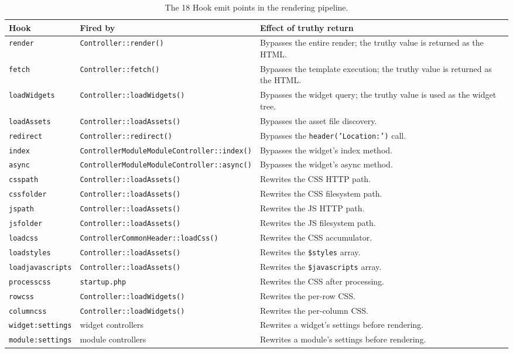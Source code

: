 \documentclass[11pt,a4paper]{article}
\begin{document}
\begin{table}[htbp]
\centering
\caption{The 18 Hook emit points in the rendering pipeline.}\label{tab:hooks}
\footnotesize\sloppy
\begin{tabularx}{\columnwidth}{llX}
\toprule
\textbf{Hook} & \textbf{Fired by} & \textbf{Effect of truthy return} \\
\midrule
\texttt{render}        & \texttt{Controller::render()}    & Bypasses the entire render; the truthy value is returned as the HTML. \\
\texttt{fetch}         & \texttt{Controller::fetch()}     & Bypasses the template execution; the truthy value is returned as the HTML. \\
\texttt{loadWidgets}   & \texttt{Controller::loadWidgets()} & Bypasses the widget query; the truthy value is used as the widget tree. \\
\texttt{loadAssets}    & \texttt{Controller::loadAssets()} & Bypasses the asset file discovery. \\
\texttt{redirect}      & \texttt{Controller::redirect()}  & Bypasses the \texttt{header('Location:')} call. \\
\texttt{index}         & \texttt{ControllerModuleModuleController::index()} & Bypasses the widget's index method. \\
\texttt{async}         & \texttt{ControllerModuleModuleController::async()} & Bypasses the widget's async method. \\
\texttt{csspath}       & \texttt{Controller::loadAssets()} & Rewrites the CSS HTTP path. \\
\texttt{cssfolder}     & \texttt{Controller::loadAssets()} & Rewrites the CSS filesystem path. \\
\texttt{jspath}        & \texttt{Controller::loadAssets()} & Rewrites the JS HTTP path. \\
\texttt{jsfolder}      & \texttt{Controller::loadAssets()} & Rewrites the JS filesystem path. \\
\texttt{loadcss}       & \texttt{ControllerCommonHeader::loadCss()} & Rewrites the CSS accumulator. \\
\texttt{loadstyles}    & \texttt{Controller::loadAssets()} & Rewrites the \texttt{\$styles} array. \\
\texttt{loadjavascripts} & \texttt{Controller::loadAssets()} & Rewrites the \texttt{\$javascripts} array. \\
\texttt{processcss}    & \texttt{startup.php}             & Rewrites the CSS after processing. \\
\texttt{rowcss}        & \texttt{Controller::loadWidgets()} & Rewrites the per-row CSS. \\
\texttt{columncss}     & \texttt{Controller::loadWidgets()} & Rewrites the per-column CSS. \\
\texttt{widget:settings} & widget controllers            & Rewrites a widget's settings before rendering. \\
\texttt{module:settings} & module controllers            & Rewrites a module's settings before rendering. \\
\bottomrule
\end{tabularx}
\end{table}
\end{document}
